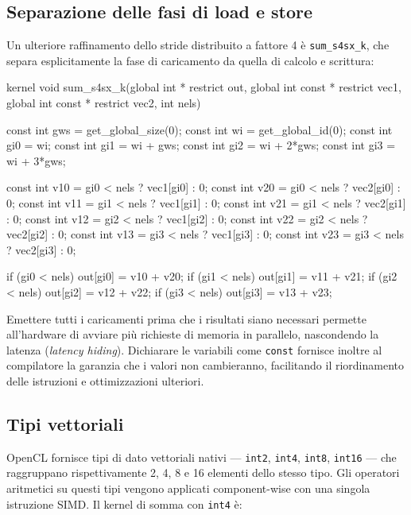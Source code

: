 \subsection{Separazione delle fasi di load e store}

Un ulteriore raffinamento dello stride distribuito a fattore 4 è \texttt{sum\_s4sx\_k}, che separa esplicitamente la fase di caricamento da quella di calcolo e scrittura:

\begin{code}[caption={Stride distribuito, fattore 4, con load separati}, label={code:sum_s4sx_k}]
kernel void sum_s4sx_k(global int * restrict out,
    global int const * restrict vec1,
    global int const * restrict vec2,
    int nels)
{
    const int gws = get_global_size(0);
    const int wi  = get_global_id(0);
    const int gi0 = wi;
    const int gi1 = wi +   gws;
    const int gi2 = wi + 2*gws;
    const int gi3 = wi + 3*gws;

    const int v10 = gi0 < nels ? vec1[gi0] : 0;
    const int v20 = gi0 < nels ? vec2[gi0] : 0;
    const int v11 = gi1 < nels ? vec1[gi1] : 0;
    const int v21 = gi1 < nels ? vec2[gi1] : 0;
    const int v12 = gi2 < nels ? vec1[gi2] : 0;
    const int v22 = gi2 < nels ? vec2[gi2] : 0;
    const int v13 = gi3 < nels ? vec1[gi3] : 0;
    const int v23 = gi3 < nels ? vec2[gi3] : 0;

    if (gi0 < nels) out[gi0] = v10 + v20;
    if (gi1 < nels) out[gi1] = v11 + v21;
    if (gi2 < nels) out[gi2] = v12 + v22;
    if (gi3 < nels) out[gi3] = v13 + v23;
}
\end{code}

Emettere tutti i caricamenti prima che i risultati siano necessari permette all'hardware di avviare più richieste di memoria in parallelo, nascondendo la latenza (\emph{latency hiding}). Dichiarare le variabili come \texttt{const} fornisce inoltre al compilatore la garanzia che i valori non cambieranno, facilitando il riordinamento delle istruzioni e ottimizzazioni ulteriori.

\subsection{Tipi vettoriali}

OpenCL fornisce tipi di dato vettoriali nativi — \texttt{int2}, \texttt{int4}, \texttt{int8}, \texttt{int16} — che raggruppano rispettivamente 2, 4, 8 e 16 elementi dello stesso tipo. Gli operatori aritmetici su questi tipi vengono applicati component-wise con una singola istruzione SIMD. Il kernel di somma con \texttt{int4} è:

